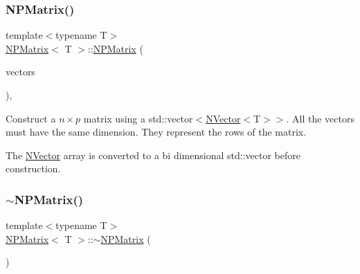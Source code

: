 \subsubsection{\texorpdfstring{NPMatrix()}{NPMatrix()}\hspace{0.1cm}{\footnotesize\ttfamily [6/7]}}
{\footnotesize\ttfamily template$<$typename T$>$ \\
\mbox{\hyperlink{class_n_p_matrix}{N\+P\+Matrix}}$<$ T $>$\+::\mbox{\hyperlink{class_n_p_matrix}{N\+P\+Matrix}} (\begin{DoxyParamCaption}\item[{const vector$<$ \mbox{\hyperlink{class_n_vector}{N\+Vector}}$<$ T $>$ $>$ \&}]{vectors }\end{DoxyParamCaption})\hspace{0.3cm}{\ttfamily [inline]}, {\ttfamily [explicit]}}



Construct a $ n \times p $ matrix using a {\ttfamily std\+::vector$<$\mbox{\hyperlink{class_n_vector}{N\+Vector}}$<$T$>$$>$}. All the vectors must have the same dimension. They represent the rows of the matrix. 

The {\ttfamily \mbox{\hyperlink{class_n_vector}{N\+Vector}}} array is converted to a bi dimensional {\ttfamily std\+::vector} before construction. \mbox{\label{class_n_p_matrix_a8679cd5ef65eea15ae5128b0e69fdd6e}} 
\subsubsection{\texorpdfstring{$\sim$NPMatrix()}{~NPMatrix()}}
{\footnotesize\ttfamily template$<$typename T$>$ \\
\mbox{\hyperlink{class_n_p_matrix}{N\+P\+Matrix}}$<$ T $>$\+::$\sim$\mbox{\hyperlink{class_n_p_matrix}{N\+P\+Matrix}} (\begin{DoxyParamCaption}{ }\end{DoxyParamCaption})\hspace{0.3cm}{\ttfamily [inline]}}

\mbox{\label{class_n_p_matrix_ab8c664f1aa435b8b1bb5e1fdd293423f}} 

